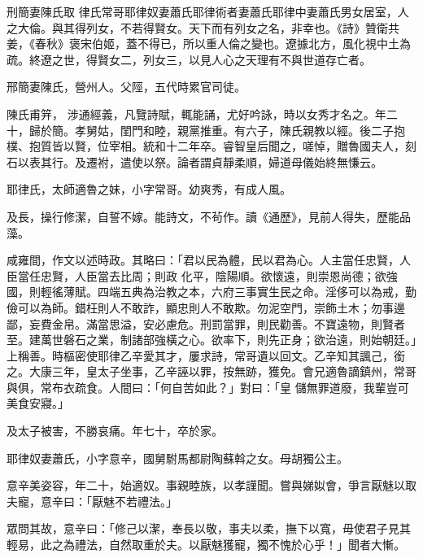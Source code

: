
\begin{pinyinscope}

 刑簡妻陳氏取
 律氏常哥耶律奴妻蕭氏耶律術者妻蕭氏耶律中妻蕭氏男女居室，人之大倫。與其得列女，不若得賢女。天下而有列女之名，非幸也。《詩》贊衛共姜，《春秋》褒宋伯姬，蓋不得已，所以重人倫之變也。遼據北方，風化視中土為疏。終遼之世，得賢女二，列女三，以見人心之天理有不與世道存亡者。



 邢簡妻陳氏，營州人。父陘，五代時累官司徒。



 陳氏甫笄，
 涉通經義，凡覽詩賦，輒能誦，尤好吟詠，時以女秀才名之。年二十，歸於簡。孝舅姑，閨門和睦，親黨推重。有六子，陳氏親教以經。後二子抱樸、抱質皆以賢，位宰相。統和十二年卒。睿智皇后聞之，嗟悼，贈魯國夫人，刻石以表其行。及遷袝，遣使以祭。論者謂貞靜柔順，婦道母儀始終無慊云。



 耶律氏，太師適魯之妹，小字常哥。幼爽秀，有成人風。



 及長，操行修潔，自誓不嫁。能詩文，不茍作。讀《通歷》，見前人得失，歷能品藻。



 咸雍間，作文以述時政。其略曰：「君以民為體，民以君為心。人主當任忠賢，人臣當任忠賢，人臣當去比周；則政
 化平，陰陽順。欲懷遠，則崇恩尚德；欲強國，則輕徭薄賦。四端五典為治教之本，六府三事實生民之命。淫侈可以為戒，勤儉可以為師。錯枉則人不敢詐，顯忠則人不敢欺。勿泥空門，崇飾土木；勿事邊鄙，妄費金帛。滿當思溢，安必慮危。刑罰當罪，則民勸善。不寶遠物，則賢者至。建萬世磐石之業，制諸部強橫之心。欲率下，則先正身；欲治遠，則始朝廷。」上稱善。時樞密使耶律乙辛愛其才，屢求詩，常哥遺以回文。乙辛知其諷己，銜之。大康三年，皇太子坐事，乙辛誣以罪，按無跡，獲免。會兄適魯謫鎮州，常哥與俱，常布衣疏食。人間曰：「何自苦如此？」對曰：「皇
 儲無罪道廢，我輩豈可美食安寢。」



 及太子被害，不勝哀痛。年七十，卒於家。



 耶律奴妻蕭氏，小字意辛，國舅駙馬都尉陶蘇斡之女。母胡獨公主。



 意辛美姿容，年二十，始適奴。事親睦族，以孝謹聞。嘗與娣姒會，爭言厭魅以取夫寵，意辛曰：「厭魅不若禮法。」



 眾問其故，意辛曰：「修己以潔，奉長以敬，事夫以柔，撫下以寬，毋使君子見其輕易，此之為禮法，自然取重於夫。以厭魅獲寵，獨不愧於心乎！」聞者大慚。




\end{pinyinscope}
